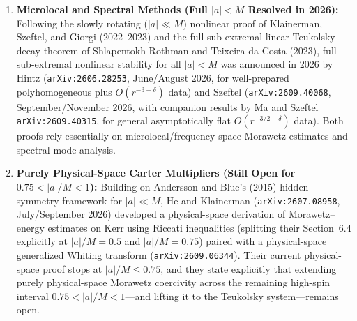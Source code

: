 \documentclass[11pt, a4paper]{article}
\theoremstyle{remark}
\begin{document}
\begin{enumerate}
\item \textbf{Microlocal and Spectral Methods (Full $|a| < M$ Resolved in 2026):} Following the slowly rotating ($|a| \ll M$) nonlinear proof of Klainerman, Szeftel, and Giorgi (2022--2023) and the full sub-extremal linear Teukolsky decay theorem of Shlapentokh-Rothman and Teixeira da Costa (2023), full sub-extremal nonlinear stability for all $|a| < M$ was announced in 2026 by Hintz (\texttt{arXiv:2606.28253}, June/August 2026, for well-prepared polyhomogeneous plus $O(r^{-3-\delta})$ data) and Szeftel (\texttt{arXiv:2609.40068}, September/November 2026, with companion results by Ma and Szeftel \texttt{arXiv:2609.40315}, for general asymptotically flat $O(r^{-3/2-\delta})$ data). Both proofs rely essentially on microlocal/frequency-space Morawetz estimates and spectral mode analysis.
\item \textbf{Purely Physical-Space Carter Multipliers (Still Open for $0.75 < |a|/M < 1$):} Building on Andersson and Blue's (2015) hidden-symmetry framework for $|a| \ll M$, He and Klainerman (\texttt{arXiv:2607.08958}, July/September 2026) developed a physical-space derivation of Morawetz--energy estimates on Kerr using Riccati inequalities (splitting their Section~6.4 explicitly at $|a|/M = 0.5$ and $|a|/M = 0.75$) paired with a physical-space generalized Whiting transform (\texttt{arXiv:2609.06344}). Their current physical-space proof stops at $|a|/M \le 0.75$, and they state explicitly that extending purely physical-space Morawetz coercivity across the remaining high-spin interval $0.75 < |a|/M < 1$---and lifting it to the Teukolsky system---remains open.
\end{enumerate}
\end{document}
